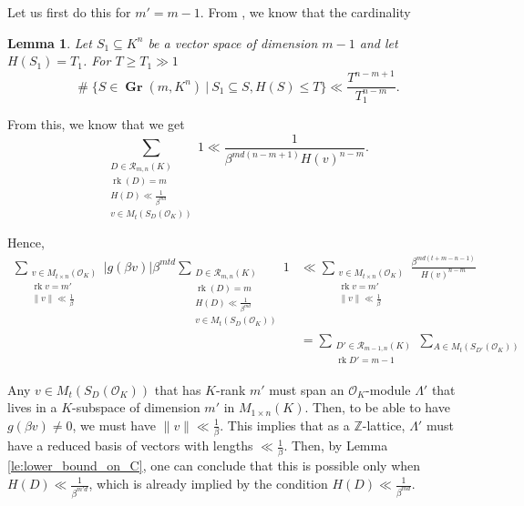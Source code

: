 \documentclass{amsart}
\newtheorem{lemma}[theorem]{Lemma}
\newcommand{\OK}{\mathcal{O}_K}
\DeclareMathOperator{\card}{\texttt{\#}}
\DeclareMathOperator{\rank}{rk}
\DeclareMathOperator{\Gr}{\mathbf{Gr}}
\begin{document}
 Let us first do this for $m'=m-1$. From \cite[Lemma 10]{S1967}, we know that the cardinality
\begin{lemma}
\label{le:adding_a_vector}
Let $S_1 \subseteq K^{n}$ be a vector space of dimension $m-1$ and let $H(S_1) = T_1$. For $T \geq T_1 \gg 1$ 
\begin{equation}
	\card \{ S \in \Gr(m,K^{n}) \ | \ S_1 \subseteq S , H(S) \le T  \} 
	\ll 
	\frac{T^{n-m+1} }{T_1^{n-m}}.
\end{equation}
\end{lemma}

From this, we know that we get 
\begin{equation}
 \sum_{\substack{D \in \mathcal{R}_{m,n}(K) \\ \rank(D)  = m\\ H(D) \ll \frac{1}{\beta^{md} }   \\ v \in M_{t}(S_{D}(\OK)) }} 1
 \ll
 \frac{1}{\beta^{ md (n-m+1)}{H(v)^{n-m}}}.
\end{equation}

Hence,
\begin{align}
 \sum_{\substack{v \in M_{t \times n}(\OK) \\ \rank v = m' \\ \|v\| \ll \frac{1}{\beta}}} 
 \left|g(\beta v)\right| \beta^{mtd} 
 \sum_{\substack{D \in \mathcal{R}_{m,n}(K) \\ \rank(D)  = m\\ H(D) \ll \frac{1}{\beta^{md} }   \\ v \in M_{t}(S_{D}(\OK)) }} 1
 & \ll  
 \sum_{\substack{v \in M_{t \times n}(\OK) \\ \rank v = m' \\ \|v\| \ll \frac{1}{\beta}}} 
 \frac{\beta^{md(t+m-n-1)}}{{H(v)^{n-m}}} \\
 & =
 \sum_{\substack{ D' \in \mathcal{R}_{m-1,n}(K) \\ \rank D'=m-1}} \sum_{A \in M_{t}(S_{D'}(\OK))}
\end{align}
\fi

 \iffalse
 Any $v \in M_t(S_D(\OK))$ that has $K$-rank $m'$ must span an $\OK$-module $\Lambda'$ that lives in a $K$-subspace of dimension $m'$ in $M_{ 1 \times n}(K)$. Then, to be able to have $g(\beta v)\neq 0$, we must have $\|v\| \ll \tfrac{1}{\beta}$. This implies that as a $\mathbb{Z}$-lattice, $\Lambda'$ must have a reduced basis of vectors with lengths $\ll \frac{1}{\beta}$. Then, by Lemma \ref{le:lower_bound_on_C}, one can conclude that this is possible only when $H(D) \ll \tfrac{1}{\beta^{m'd}}$, which is already implied by the condition $H(D) \ll \frac{1}{\beta^{md}}$.
\end{document}
